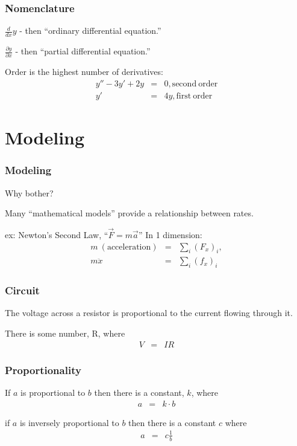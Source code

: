 \documentclass{beamer}
\newcommand{\deriv}[2]{\frac{d}{d#2}#1}
\newcommand{\lp}{\left(}
\newcommand{\rp}{\right)}
\begin{document}
\begin{frame}
  \frametitle{Nomenclature}
  
  \vfill

  $\deriv{y}{x}$ - then ``ordinary differential equation.''

  \vfill

  $\frac{\partial y}{\partial x}$ - then ``partial differential
  equation.''

  \vfill

  Order is the highest number of derivatives:
  \begin{eqnarray*}
    y'' - 3 y' + 2y & = & 0, \mathrm{second~order} \\
    y'  & = & 4y, \mathrm{first~order} 
  \end{eqnarray*}

  \vfill


\end{frame}

\section{Modeling}


\begin{frame}
  \frametitle{Modeling}

  Why bother?

  Many ``mathematical models'' provide a relationship between rates.

  ex: Newton's Second Law, ``$\vec{F} = m \vec{a}$'' In 1 dimension:
  \begin{eqnarray*}
    m\mathrm{~(acceleration)} & = & \sum_i \lp F_x \rp_i, \\
    m \ddot{x} & = & \sum_i \lp f_x \rp_i
  \end{eqnarray*}

  
\end{frame}


\begin{frame}
  \frametitle{Circuit}
  
  The voltage across a resistor is proportional to the current flowing
  through it.

  There is some number, R, where
  \begin{eqnarray*}
    V & = & IR
  \end{eqnarray*}
\end{frame}

\begin{frame}
  \frametitle{Proportionality}
  
  If $a$ is proportional to $b$ then there is a constant, $k$, where 
  \begin{eqnarray*}
    a  & = & k \cdot b
  \end{eqnarray*}

  if $a$ is inversely proportional to $b$ then there is a constant $c$
  where 
  \begin{eqnarray*}
    a & = & c \frac{1}{b}
  \end{eqnarray*}
\end{frame}
\end{document}
